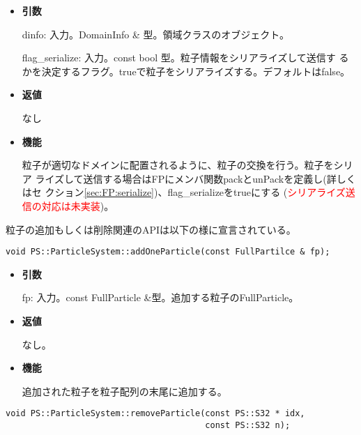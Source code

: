 \begin{itemize}

\item {\bf 引数}

dinfo: 入力。DomainInfo \& 型。領域クラスのオブジェクト。

flag\_serialize: 入力。const bool 型。粒子情報をシリアライズして送信す
るかを決定するフラグ。trueで粒子をシリアライズする。デフォルトはfalse。

\item {\bf 返値}

なし

\item {\bf 機能}

粒子が適切なドメインに配置されるように、粒子の交換を行う。粒子をシリア
ライズして送信する場合はFPにメンバ関数packとunPackを定義し(詳しくはセ
クション\ref{sec:FP:serialize})、flag\_serializeをtrueにする (\textcolor{red}{シリアライズ送信の対応は未実装})。

\end{itemize}

\label{sec:addAndRemoveParticle}

粒子の追加もしくは削除関連のAPIは以下の様に宣言されている。

\begin{screen}
\begin{verbatim}
void PS::ParticleSystem::addOneParticle(const FullPartilce & fp);
\end{verbatim}
\end{screen}

\begin{itemize}

\item {\bf 引数}

fp: 入力。const FullParticle \&型。追加する粒子のFullParticle。

\item {\bf 返値}

なし。

\item {\bf 機能}

追加された粒子を粒子配列の末尾に追加する。

\end{itemize}


\begin{screen}
\begin{verbatim}
void PS::ParticleSystem::removeParticle(const PS::S32 * idx, 
                                        const PS::S32 n);
\end{verbatim}
\end{screen}

